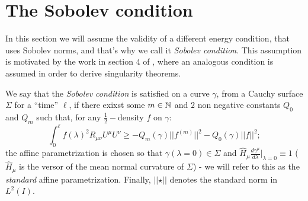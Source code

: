 \section{The Sobolev condition}
In this section we will assume the validity of a different energy condition, that uses Sobolev norms, and that's why we call it \emph{Sobolev condition}.
This assumption is motivated by the work in section \(4\) of \cite{fewster2020new}, where an analogous condition is assumed in order to derive singularity theorems.

\begin{definition}
	We say that the \emph{Sobolev condition} is satisfied on a curve \(\gamma\), from a Cauchy surface \(\Sigma\) for a ``time'' \(\ell\), if there exixst some \(m\in {\mathbb{N}}\) and \(2\) non negative constants \(Q_0\) and \(Q_m\) such that, for any \(\frac{1}{2}-\)density \(f\) on \(\gamma\):
	\[
		\int_0^{\ell} f(\lambda)^2 R_{\mu\nu}U^{\mu}U^{\nu} \ge -Q_m(\gamma) \vert\vert f^{(m)}\vert\vert^2 - Q_0(\gamma) \vert\vert f\vert\vert^2;
	\]
	the affine parametrization is chosen so that \(\gamma(\lambda = 0) \in \Sigma\) and \(\hat{H}_{\mu}\frac{d\gamma^{\mu}}{d\lambda}\Big\vert_{\lambda = 0} \equiv 1\) (\(\hat{H}_{\mu}\) is the versor of the mean normal curvature of \(\Sigma\)) - we will refer to this as the \emph{standard} affine parametrization. Finally, \(\vert\vert \star \vert\vert\) denotes the standard norm in \(L^2(I)\).
\end{definition}

